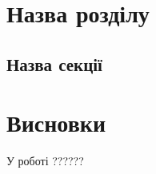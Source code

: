 \documentclass{thesis}
\begin{document}
\iffalse
Розпишемо матриці $[\omega_1],\ [\omega_2]$ оператора множення. Для множення на $\omega_1$ маємо
\begin{align*}
\omega_1 \cdot 1 = \omega_1 = 0 \cdot 1 + 1 \cdot \omega_1 + 0 \cdot \omega_2 \\
\omega_1 \cdot \omega_1 = -ac + b \omega_1 + a \omega_2 \\
\omega_1 \cdot \omega_2 = ad = ad \cdot 1 + 0 \cdot \omega_1 + 0 \cdot \omega_2
\end{align*}
Водночас для множення на $\omega_2$ маємо
\begin{align*}
\omega_2 \cdot 1 = \omega_2 = 0 \cdot 1 + 0 \cdot \omega_1 + 1 \cdot \omega_2 \\
\omega_2 \cdot \omega_1 = ad = ad \cdot 1 + 0 \cdot \omega_1 + 0 \cdot \omega_2 \\
\omega_2 \cdot \omega_2 = -bd + d \omega_1 + c 
\end{align*}
Звідси отримуємо матриці
\begin{align*}
[\omega_1] = \begin{pmatrix}
0 & -ac & ad \\
1 & b & 0 \\
0 & a & 0
\end{pmatrix},\quad [\omega_2] = \begin{pmatrix}
0 & ad & -bd \\
0 & 0 & d \\
1 & 0 & c
\end{pmatrix}
\end{align*}
\fi

\newpage

\chapter{Назва розділу}\label{chaper2}

\section{Назва секції}\label{section2.1}


\newpage

\chapter*{Висновки}

У роботі ??????

\newpage

\renewcommand{\bibname}{Список використаних джерел}
\end{document}
